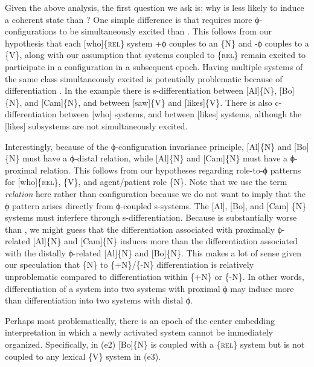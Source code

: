   Given the above analysis, the first question we ask is: why is  less likely to induce a coherent state than ? One simple difference is that  requires more ϕ-configurations to be simultaneously excited than . This follows from our hypothesis that each [who]\{\textsc{rel}\} system +ϕ couples to an \{N\} and -ϕ couples to a \{V\}, along with our assumption that systems coupled to \{\textsc{rel}\} remain excited to participate in a configuration in a subsequent epoch. Having multiple systems of the same class simultaneously excited is potentially problematic because of differentiation . In the example there is s-differentiation  between [Al]\{N\}, [Bo]\{N\}, and [Cam]\{N\}, and between [saw]\{V\} and [likes]\{V\}. There is also c-differentiation  between [who] systems, and between [likes] systems, although the [likes] subsystems are not simultaneously excited. 

  Interestingly, because of the ϕ-configuration invariance principle, [Al]\{N\} and [Bo]\{N\} must have a ϕ-distal relation, while [Al]\{N\} and [Cam]\{N\} must have a ϕ-proximal relation. This follows from our hypotheses regarding role-to-ϕ patterns for [who]\{\textsc{rel}\},  \{V\}, and agent/patient role \{N\}. Note that we use the term \textit{relation} here rather than configuration because we do not want to imply that the ϕ pattern arises directly from ϕ-coupled s-systems. The [Al], [Bo], and [Cam] \{N\} systems must interfere through s-differentiation. Because  is substantially worse than , we might guess that the differentiation associated with proximally ϕ-related [Al]\{N\} and [Cam]\{N\} induces more  than the differentiation associated with the distally ϕ-related [Al]\{N\} and [Bo]\{N\}. This makes a lot of sense given our speculation that \{N\} to \{+N\}/\{-N\} differentiation is relatively unproblematic compared to differentiation within \{+N\} or \{-N\}. In other words, differentiation of a system into two systems with proximal ϕ may induce more  than differentiation into two systems with distal ϕ.

  Perhaps most problematically, there is an epoch of the center embedding interpretation in which a newly activated system cannot be immediately organized. Specifically, in (e2) [Bo]\{N\} is coupled with a \{\textsc{rel}\} system but is not coupled to any lexical \{V\} system in (e3). 

